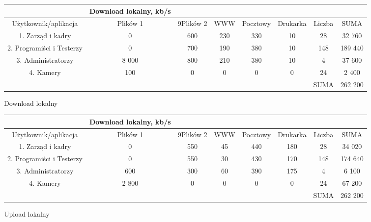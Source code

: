 \documentclass{article}
\begin{document}
\begin{Tabela}[!ht]
	\centering
\begin{tabular}{|c|c|c|c|c|c|c|c} \hline
	& Download lokalny, kb/s \\
	\hline
	Użytkownik/aplikacja & Plików 1 & 9Plików 2&WWW&Pocztowy&Drukarka&Liczba&SUMA\\
	\hline
	1. Zarząd i kadry  & 0 & 600&230&330&10&28&32 760\\
	2. Programiści i Testerzy & 0 & 700&190&380&10&148&189 440\\
	3. Administratorzy & 8 000 & 800&210&380&10&4&37 600\\
	4. Kamery & 100 & 0&0&0&0&24&2 400\\
	\hline
	\hline
	&&&&&&SUMA &262 200 \\
	\hline
\end{tabular}
\caption{Download lokalny}
\end{Tabela}
\begin{Tabela}[!ht]
	\centering
	\begin{tabular}{|c|c|c|c|c|c|c|c} \hline
		& Download lokalny, kb/s \\
		\hline
		Użytkownik/aplikacja & Plików 1 & 9Plików 2&WWW&Pocztowy&Drukarka&Liczba&SUMA\\
		\hline
		1. Zarząd i kadry  & 0 & 550 & 45 & 440 & 180 & 28 & 34 020\\
		2. Programiści i Testerzy & 0 & 550 & 30 & 430 & 170 & 148 & 174 640\\
		3. Administratorzy & 600 & 300 & 60 & 390 & 175 & 4 &6 100\\
		4. Kamery & 2 800 & 0 & 0 & 0 & 0 & 24 & 67 200\\
		\hline
		\hline
		&&&&&&SUMA &262 200 \\
		\hline
	\end{tabular}
	\caption{Upload lokalny}
\end{Tabela}
\end{document}
